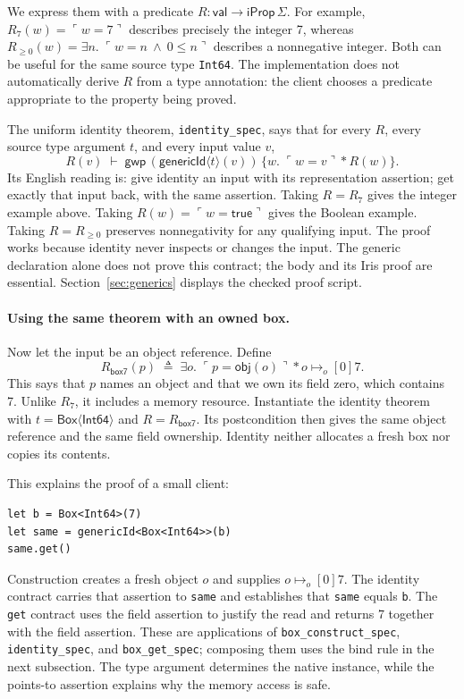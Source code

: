 \documentclass[11pt]{article}
\newcommand{\ptso}{\mathrel{\mapsto_{o}}}
\newcommand{\sep}{\mathbin{*}}
\newcommand{\GWpre}{\mathsf{gwp}}
\newcommand{\pure}[1]{\ulcorner #1 \urcorner}
\begin{document}
We express them with a predicate
\(R:\mathsf{val}\to\mathsf{iProp}\,\Sigma\). For example,
\(R_7(w)=\pure{w=7}\) describes precisely the integer 7, whereas
\(R_{\geq 0}(w)=\exists n.\;\pure{w=n\ \wedge\ 0\leq n}\)
describes a nonnegative integer. Both can be useful for the same source
type \texttt{Int64}. The implementation does not automatically derive
\(R\) from a type annotation: the client chooses a predicate appropriate
to the property being proved.

The uniform identity theorem, \texttt{identity\_spec}, says that for
every \(R\), every source type argument \(t\), and every input value \(v\),
\[
R(v)\;\vdash\;
\GWpre\,(\mathsf{genericId}\langle t\rangle(v))
  \,\{w.\;\pure{w=v}\sep R(w)\}.
\]
Its English reading is: give identity an input with its representation
assertion; get exactly that input back, with the same assertion. Taking
\(R=R_7\) gives the integer example above. Taking
\(R(w)=\pure{w=\mathsf{true}}\) gives the Boolean example. Taking
\(R=R_{\geq 0}\) preserves nonnegativity for any qualifying input.
The proof works because identity never inspects or changes the input.
The generic declaration alone does not prove this contract; the body
and its Iris proof are essential. Section~\ref{sec:generics} displays
the checked proof script.

\paragraph{Using the same theorem with an owned box.}
Now let the input be an object reference. Define
\[
R_{\mathsf{box7}}(p)\;\triangleq\;
\exists o.\;\pure{p=\mathsf{obj}(o)}\sep o\ptso[0]7.
\]
This says that \(p\) names an object and that we own its field zero,
which contains 7. Unlike \(R_7\), it includes a memory resource.
Instantiate the identity theorem with \(t=\mathsf{Box}\langle
\mathsf{Int64}\rangle\) and \(R=R_{\mathsf{box7}}\). Its postcondition
then gives the same object reference and the same field ownership.
Identity neither allocates a fresh box nor copies its contents.

This explains the proof of a small client:
\begin{lstlisting}
let b = Box<Int64>(7)
let same = genericId<Box<Int64>>(b)
same.get()
\end{lstlisting}
Construction creates a fresh object \(o\) and supplies
\(o\ptso[0]7\). The identity contract carries that assertion to
\texttt{same} and establishes that \texttt{same} equals \texttt{b}.
The \texttt{get} contract uses the field assertion to justify the read
and returns 7 together with the field assertion. These are applications
of \texttt{box\_construct\_spec}, \texttt{identity\_spec}, and
\texttt{box\_get\_spec}; composing them uses the bind rule in the next
subsection. The type argument determines the native instance, while the
points-to assertion explains why the memory access is safe.
\end{document}
